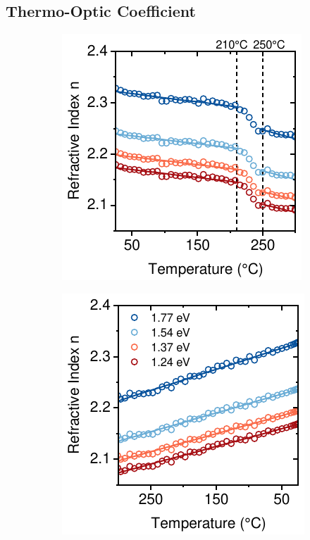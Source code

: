 \subsection{Thermo-Optic Coefficient}

\begin{figure}[htbp]
    \centering
    \begin{subfigure}{0.32\textwidth}
        \includegraphics[width=\textwidth]{chapters/ellipsometry/image/Thermo-optic_Coefficient_heating.pdf}
        \caption{}
        \label{fig:ellipsometry:thermooptic_heating}
    \end{subfigure}
    \hfill
    \begin{subfigure}{0.32\textwidth}
        \includegraphics[width=\textwidth]{chapters/ellipsometry/image/Thermo-optic_Coefficient_cooling.pdf}

\end{subfigure}
\end{figure}
